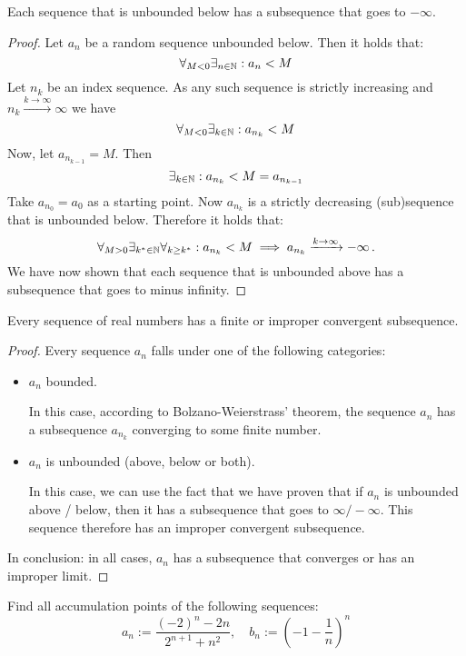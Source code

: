 \documentclass[week=4]{homework}
\begin{document}
\begin{questions}
        \begin{inlinetoprove}
        	Each sequence that is unbounded below has a subsequence that goes to $- \infty$.
        \end{inlinetoprove}
        \begin{proof}
        	Let $a_n$ be a random sequence unbounded below. Then it holds that:
        	\[
        	\forall_{M < 0} \exists_{n \in \mathbb{N}} : a_n < M
        	\]
        	Let $n_k$ be an index sequence. As any such sequence is strictly increasing and $n_k \xrightarrow{k\to\infty} \infty$ we have
        	\[
        	\forall_{M < 0} \exists_{k \in \mathbb{N}} : a_{n_{k}} < M
        	\]
        	Now, let $a_{n_{k-1}} = M$. Then
        	\[
        	\exists_{k \in \mathbb{N}} : a_{n_{k}} < M = a_{n_{k-1}}
        	\]
        	Take $a_{n_0} = a_0$ as a starting point. Now $a_{n_k}$ is a strictly decreasing (sub)sequence that is unbounded below. Therefore it holds that:
        	\[
        	\forall_{M > 0} \exists_{k^* \in \mathbb{N}} \forall_{k \ge k^*} : a_{n_k} < M \implies a_{n_k} \xrightarrow{k \to \infty} -\infty\,.
        	\]
        	We have now shown that each sequence that is unbounded above has a subsequence that goes to minus infinity.
        \end{proof}
        
        \begin{inlinetoprove}
        	Every sequence of real numbers has a finite or improper convergent subsequence. 
        \end{inlinetoprove}
        \begin{proof}
        	Every sequence $a_n$ falls under one of the following categories:
        	\begin{itemize}
        		\item $a_n$ bounded.
        		
	        	In this case, according to Bolzano-Weierstrass' theorem, the sequence $a_n$ has a subsequence $a_{n_k}$ converging to some finite number.
        	
        		\item $a_n$ is unbounded (above, below or both).
        		
		        In this case, we can use the fact that we have proven that if $a_n$ is unbounded above / below, then it has a subsequence that goes to $\infty / - \infty$. This sequence therefore has an improper convergent subsequence. 
        	\end{itemize}
        	In conclusion: in all cases, $a_n$ has a subsequence that converges or has an improper limit. 
        \end{proof}
        \question
        Find all accumulation points of the following sequences:
        \[
	        a_n := \frac{(-2)^n - 2n}{2^{n+1}+n^2}, \quad b_n := \left(-1-\frac{1}{n}\right)^n
        \]
        

\end{questions}
\end{document}
